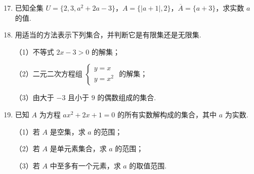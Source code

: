 \documentclass[a4paper,11pt]{article}
\begin{document}
\begin{enumerate}
\setcounter{enumi}{16}

\item 已知全集 $U=\{2,3,a^2+2a-3\}$，$A=\{|a+1|,2\}$，$\overline A=\{a+3\}$，求实数 $a$ 的值.


\ansspace[6]

\ifanswer
\solbegin
{}
\solend
\fi

\item 用适当的方法表示下列集合，并判断它是有限集还是无限集.

\keepwithprev
（1）不等式 $2x-3>0$ 的解集；

\keepwithprev
（2）二元二次方程组 $\begin{cases}y=x\\ y=x^2\end{cases}$ 的解集；

\keepwithprev
（3）由大于 $-3$ 且小于 $9$ 的偶数组成的集合.


\ansspace[6]

\ifanswer
\solbegin
{}
\solend
\fi

\item 已知 $A$ 为方程 $ax^2+2x+1=0$ 的所有实数解构成的集合，其中 $a$ 为实数.

\keepwithprev
（1）若 $A$ 是空集，求 $a$ 的范围；

\keepwithprev
（2）若 $A$ 是单元素集合，求 $a$ 的范围；

\keepwithprev
（3）若 $A$ 中至多有一个元素，求 $a$ 的取值范围.


\ansspace[6]


\end{enumerate}
\end{document}
